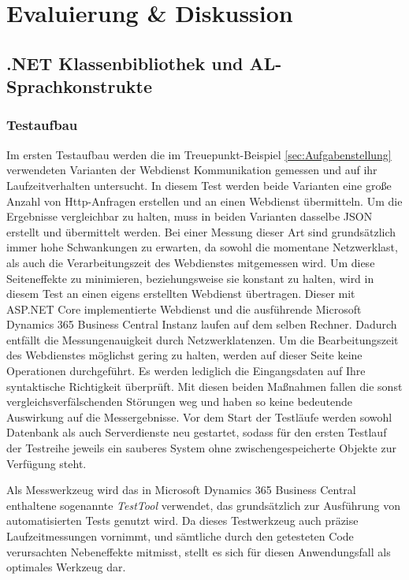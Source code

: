 \chapter{Evaluierung \& Diskussion}
\label{cha:Tests und Evaluierung}

\section{.NET Klassenbibliothek und AL-Sprachkonstrukte}
\subsection{Testaufbau}
Im ersten Testaufbau werden die im Treuepunkt-Beispiel \ref{sec:Aufgabenstellung} verwendeten Varianten der Webdienst Kommunikation gemessen und auf ihr Laufzeitverhalten untersucht. In diesem Test werden beide Varianten eine große Anzahl von Http-Anfragen erstellen und an einen Webdienst übermitteln. Um die Ergebnisse vergleichbar zu halten, muss in beiden Varianten dasselbe JSON erstellt und übermittelt werden. Bei einer Messung dieser Art sind grundsätzlich immer hohe Schwankungen zu erwarten, da sowohl die momentane Netzwerklast, als auch die Verarbeitungszeit des Webdienstes mitgemessen wird. Um diese Seiteneffekte zu minimieren, beziehungsweise sie konstant zu halten, wird in diesem Test an einen eigens erstellten Webdienst übertragen. Dieser mit ASP.NET Core implementierte Webdienst und die ausführende Microsoft Dynamics 365 Business Central Instanz laufen auf dem selben Rechner. Dadurch entfällt die Messungenauigkeit durch Netzwerklatenzen. Um die Bearbeitungszeit des Webdienstes möglichst gering zu halten, werden auf dieser Seite keine Operationen durchgeführt. Es werden lediglich die Eingangsdaten auf Ihre syntaktische Richtigkeit überprüft. Mit diesen beiden Maßnahmen fallen die sonst vergleichsverfälschenden Störungen weg und haben so keine bedeutende Auswirkung auf die Messergebnisse. Vor dem Start der Testläufe werden sowohl Datenbank als auch Serverdienste neu gestartet, sodass für den ersten Testlauf der Testreihe jeweils ein sauberes System ohne zwischengespeicherte Objekte zur Verfügung steht.

Als Messwerkzeug wird das in Microsoft Dynamics 365 Business Central enthaltene sogenannte \textit{TestTool} verwendet, das grundsätzlich zur Ausführung von automatisierten Tests genutzt wird. Da dieses Testwerkzeug auch präzise Laufzeitmessungen vornimmt, und sämtliche durch den getesteten Code verursachten Nebeneffekte mitmisst, stellt es sich für diesen Anwendungsfall als optimales Werkzeug dar.
\pagebreak

